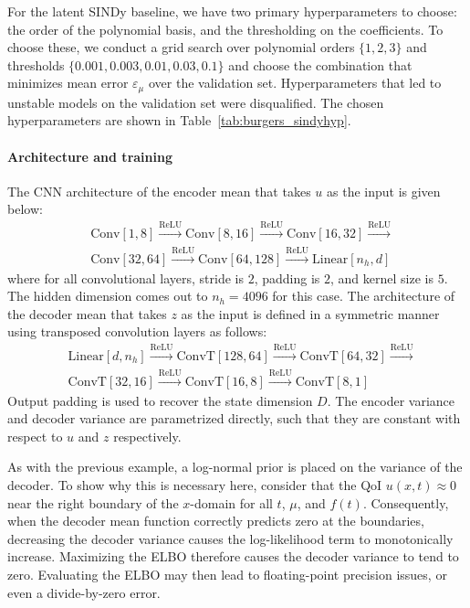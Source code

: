 \documentclass{article}
\begin{document}
	For the latent SINDy baseline, we have two primary hyperparameters to choose: the order of the polynomial basis, and the thresholding on the coefficients. To choose these, we conduct a grid search over polynomial orders $\{1, 2, 3\}$ and thresholds $\{0.001, 0.003, 0.01, 0.03, 0.1\}$ and choose the combination that minimizes mean error $\varepsilon_\mu$ over the validation set. Hyperparameters that led to unstable models on the validation set were disqualified. The chosen hyperparameters are shown in Table~\ref{tab:burgers_sindyhyp}.
	
	\paragraph{Architecture and training}
	
	The CNN architecture of the encoder mean that takes ${u}$ as the input is given below:
	\begin{equation*}
		\begin{aligned}
			& \textrm{Conv}[1, 8] \xrightarrow{\text{ReLU}} \textrm{Conv}[8, 16] \xrightarrow{\text{ReLU}} \textrm{Conv}[16, 32] \xrightarrow{\text{ReLU}} \\
			& \textrm{Conv}[32, 64] \xrightarrow{\text{ReLU}} \textrm{Conv}[64, 128] \xrightarrow{\text{ReLU}} \textrm{Linear}[n_h, d]
		\end{aligned}
	\end{equation*}
	where for all convolutional layers, stride is $2$, padding is $2$, and kernel size is $5$. The hidden dimension comes out to $n_h = 4096$ for this case. The architecture of the decoder mean that takes $z$ as the input is defined in a symmetric manner using transposed convolution layers as follows:
	\begin{equation*}
		\begin{aligned}
			& \textrm{Linear}[d, n_h] \xrightarrow{\text{ReLU}} \textrm{ConvT}[128, 64] \xrightarrow{\text{ReLU}} \textrm{ConvT}[64, 32] \xrightarrow{\text{ReLU}} \\
			& \textrm{ConvT}[32, 16] \xrightarrow{\text{ReLU}} \textrm{ConvT}[16, 8] \xrightarrow{\text{ReLU}} \textrm{ConvT}[8, 1]
		\end{aligned}
	\end{equation*}
	Output padding is used to recover the state dimension $D$. The encoder variance and decoder variance are parametrized directly, such that they are constant with respect to $u$ and $z$ respectively.
	
	As with the previous example, a log-normal prior is placed on the variance of the decoder. To show why this is necessary here, consider that the QoI $u(x, t) \approx 0$ near the right boundary of the $x$-domain for all $t$, $\mu$, and $f(t)$. Consequently, when the decoder mean function correctly predicts zero at the boundaries, decreasing the decoder variance causes the log-likelihood term to monotonically increase. Maximizing the ELBO therefore causes the decoder variance to tend to zero. Evaluating the ELBO may then lead to floating-point precision issues, or even a divide-by-zero error.
	
\end{document}
